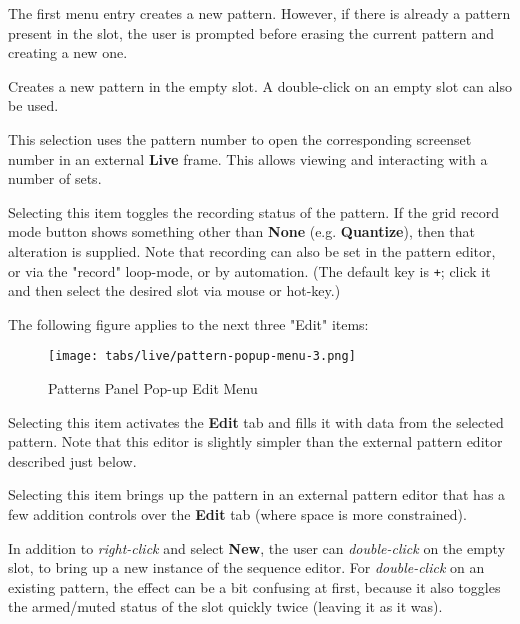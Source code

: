    The first menu entry creates a new pattern.  However, if there is
   already a pattern present in the slot, the user is prompted before erasing
   the current pattern and creating a new one.

   \setcounter{ItemCounter}{0}      %

   Creates a new pattern in the empty slot.
   A double-click on an empty slot can also be used.

   This selection uses the pattern number to open the corresponding screenset
   number in an external \textbf{Live} frame.
   This allows viewing and interacting with a number of sets.

   Selecting this item toggles the recording status of the pattern.
   If the grid record mode button shows something other than
   \textbf{None} (e.g. \textbf{Quantize}), then that alteration is supplied.
   Note that recording can also be set in the pattern editor, or via
   the "record" loop-mode, or by automation.
   (The default key is \texttt{+}; click it and then select the
   desired slot via mouse or hot-key.)

   The following figure applies to the next three "Edit" items:

\begin{figure}[H]
   \centering 
   \texttt{[image: tabs/live/pattern-popup-menu-3.png]}
   \caption{Patterns Panel Pop-up Edit Menu}
   \label{fig:patterns_panel_popup_edit_menu}
\end{figure}

   Selecting this item activates the \textbf{Edit} tab and fills it with data
   from the selected pattern.
   Note that this editor is slightly simpler than the external pattern editor
   described just below.

   Selecting this item brings up the pattern in an external pattern editor that
   has a few addition controls over the \textbf{Edit} tab (where space is more
   constrained).

   In addition to \textsl{right-click} and select \textbf{New}, the user can
   \textsl{double-click} on the empty slot,
   to bring up a new instance of the sequence
   editor.  For \textsl{double-click} on an existing pattern,
   the effect can be a bit confusing at first,
   because it also toggles the armed/muted status of the slot
   quickly twice (leaving it as it was).

